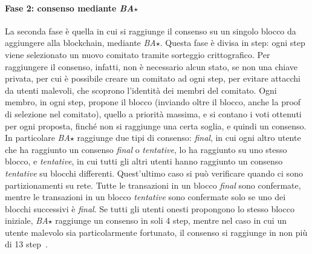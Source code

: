 \paragraph*{Fase 2: consenso mediante \emph{BA$\star$}}
La seconda fase è quella in cui si raggiunge il consenso su un singolo blocco da aggiungere alla blockchain, mediante \emph{BA$\star$}. Questa fase è divisa in step: ogni step viene selezionato un nuovo comitato tramite sorteggio crittografico. Per raggiungere il consenso, infatti, non è necessario alcun stato, se non una chiave privata, per cui è possibile creare un comitato ad ogni step, per evitare attacchi da utenti malevoli, che scoprono l'identità dei membri del comitato.
Ogni membro, in ogni step, propone il blocco (inviando oltre il blocco, anche la proof di selezione nel comitato), quello a priorità massima, e si contano i voti ottenuti per ogni proposta, finché non si raggiunge una certa soglia, e quindi un consenso. In particolare \emph{BA$\star$} raggiunge due tipi di consenso: \emph{final}, in cui ogni altro utente che ha raggiunto un consenso \emph{final} o \emph{tentative}, lo ha raggiunto su uno stesso blocco, e \emph{tentative}, in cui tutti gli altri utenti hanno raggiunto un consenso \emph{tentative} su blocchi differenti. Quest'ultimo caso si può verificare quando ci sono partizionamenti su rete. Tutte le transazioni in un blocco \emph{final} sono confermate, mentre le transazioni in un blocco \emph{tentative} sono confermate solo se uno dei blocchi successivi è \emph{final}.
Se tutti gli utenti onesti propongono lo stesso blocco iniziale, \emph{BA$\star$} raggiunge un consenso in soli 4 step, mentre nel caso in cui un utente malevolo sia particolarmente fortunato, il consenso si raggiunge in non più di 13 step~\cite{chen2019algorand}.

